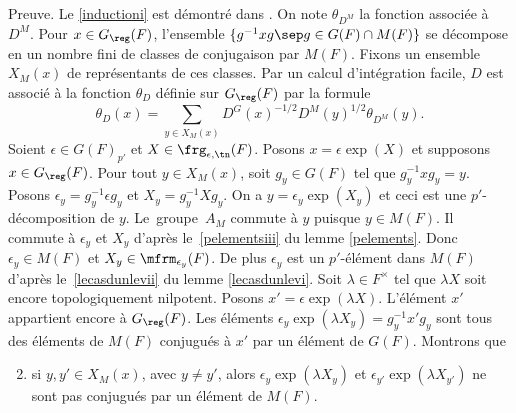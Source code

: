 Preuve. Le \eqref{inductioni} est démontré dans \cite[Lem.\,2.3]{W3}. On note $\theta_{D^M}$ la fonction associée à~$D^M$. Pour $x\in G_{\reg}(F)$, l'ensemble $\{g^{-1}xg\sep g\in G(F)\cap M(F)\}$ se décompose en un nombre fini de classes de conjugaison par $M(F)$. Fixons un ensemble $X_{M}(x)$ de représentants de ces classes. Par un calcul d'intégration facile, $D$ est associé à la fonction $\theta_{D}$ définie sur $G_{\reg}(F)$ par la formule\vspace*{-2pt}\enlargethispage{.5\baselineskip}%
\begin{equation}\tag{1}\label{induction1}
\theta_{D}(x)=\sum_{y\in X_{M}(x)}D^G(x)^{-1/2}D^M(y)^{1/2}\theta_{D^M}(y).
\end{equation}
Soient $\epsilon\in G(F)_{p'}$ et $X\in \frg_{\epsilon,\tn}(F)$. Posons $x=\epsilon \exp(X)$ et supposons $x\in G_{\reg}(F)$. Pour tout $y\in X_{M}(x)$, soit $g_{y}\in G(F)$ tel que $g_{y}^{-1}xg_{y}=y$. Posons $\epsilon_{y}=g_{y}^{-1}\epsilon g_{y}$ et $X_{y}=g_{y}^{-1}X g_{y}$. On a $y=\epsilon_{y}\exp(X_{y})$ et ceci est une $p'$-décomposition de $y$. Le~grou\-pe~$A_{M}$ commute à $y$ puisque $y\in M(F)$. Il commute à $\epsilon_{y}$ et $X_{y}$ d'après le~\eqref{pelementsiii} du lemme \ref{pelements}. Donc $\epsilon_{y}\in M(F)$ et $X_{y}\in \mfrm_{\epsilon_{y}}(F)$. De plus $\epsilon_{y}$ est un $p'$-élément dans $M(F)$ d'après le~\eqref{lecasdunlevii} du lemme \ref{lecasdunlevi}. Soit $\lambda\in F^{\times}$ tel que $\lambda X$ soit encore topologiquement nilpotent. Posons $x'=\epsilon \exp(\lambda X)$. L'élément $x'$ appartient encore à $G_{\reg}(F)$. Les éléments $\epsilon_{y}\exp(\lambda X_{y})=g_{y}^{-1}x'g_{y}$ sont tous des éléments de $M(F)$ conjugués à $x'$ par un élément de $G(F)$. Montrons que
\begin{enumerate}\setcounter{enumi}{1}
\item\label{induction2}
si $y,y'\in X_{M}(x)$, avec $y\neq y'$, alors $\epsilon_{y}\exp(\lambda X_{y})$ et $\epsilon_{y'}\exp(\lambda X_{y'})$ ne sont pas conjugués par un élément de $M(F)$.
\end{enumerate}

